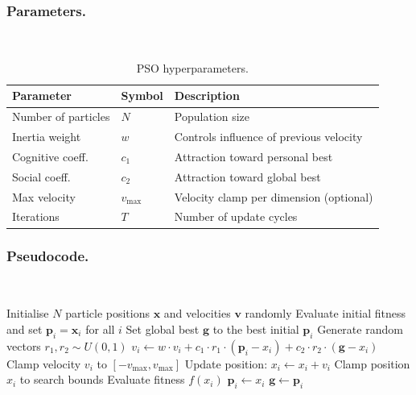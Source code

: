 \subsubsection{Parameters.}~

\begin{table}[H]
\centering
\caption{PSO hyperparameters.}
\label{tab:pso-params}
\begin{tabular}{l l p{7cm}}
\hline
\textbf{Parameter} & \textbf{Symbol} & \textbf{Description} \\
\hline
Number of particles & $N$          & Population size \\
Inertia weight      & $w$          & Controls influence of previous velocity \\
Cognitive coeff.    & $c_1$        & Attraction toward personal best \\
Social coeff.       & $c_2$        & Attraction toward global best \\
Max velocity        & $v_{\max}$   & Velocity clamp per dimension (optional) \\
Iterations          & $T$          & Number of update cycles \\
\hline
\end{tabular}
\end{table}

\subsubsection{Pseudocode.}~

\begin{algorithm}[H]
\caption{Particle Swarm Optimisation}
\label{alg:pso}
\begin{algorithmic}[1]
  \State Initialise $N$ particle positions $\mathbf{x}$ and velocities $\mathbf{v}$ randomly
  \State Evaluate initial fitness and set $\mathbf{p}_i = \mathbf{x}_i$ for all $i$
  \State Set global best $\mathbf{g}$ to the best initial $\mathbf{p}_i$
      \State Generate random vectors $r_1, r_2 \sim U(0,1)$
      \State $v_i \gets w \cdot v_i + c_1 \cdot r_1 \cdot (\mathbf{p}_i - x_i) + c_2 \cdot r_2 \cdot (\mathbf{g} - x_i)$
      \State Clamp velocity $v_i$ to $[-v_{\max}, v_{\max}]$
      \State Update position: $x_i \gets x_i + v_i$
      \State Clamp position $x_i$ to search bounds
   \State Evaluate fitness $f(x_i)$
        \State $\mathbf{p}_i \gets x_i$
          \State $\mathbf{g} \gets \mathbf{p}_i$
        \EndIf
      \EndIf
    \EndFor
  \EndFor
\end{algorithmic}
\end{algorithm}


